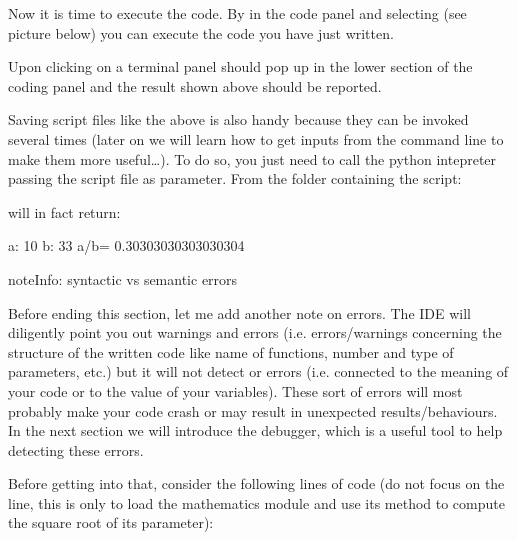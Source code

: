 \documentclass[letterpaper,10pt,english]{sphinxmanual}
\let\sphinxpxdimen\pdfpxdimen\else\newdimen\sphinxpxdimen
\begin{document}
\sphinxAtStartPar
Now it is time to execute the code. By  in the code panel and selecting  (see picture below) you can execute the code you have just written.

\noindent\sphinxincludegraphics[width=874\sphinxpxdimen,height=454\sphinxpxdimen]{{pythonrun}.png}

\sphinxAtStartPar
Upon clicking on  a terminal panel should pop up in the lower section of the coding panel and the result shown above should be reported.

\sphinxAtStartPar
Saving script files like the  above is also handy because they can be invoked several times (later on we will learn how to get inputs from the command line to make them more useful…). To do so, you just need to call the python intepreter passing the script file as parameter. From the folder containing the  script:

\sphinxAtStartPar
{}

\sphinxAtStartPar
will in fact return:

\sphinxAtStartPar
a: 10 b: 33 a/b= 0.30303030303030304

\begin{sphinxadmonition}{note}{Info: syntactic vs semantic errors}\par
\sphinxAtStartPar
Before ending this section, let me add another note on errors. The IDE will diligently point you out  warnings and errors (i.e. errors/warnings concerning the structure of the written code like name of functions, number and type of parameters, etc.) but it will not detect  or  errors (i.e. connected to the meaning of your code or to the value of your variables). These sort of errors will most probably make your code crash or may result in unexpected
results/behaviours. In the next section we will introduce the debugger, which is a useful tool to help detecting these errors.
\end{sphinxadmonition}

\sphinxAtStartPar
Before getting into that, consider the following lines of code (do not focus on the  line, this is only to load the mathematics module and use its method  to compute the square root of its parameter):
\end{document}
